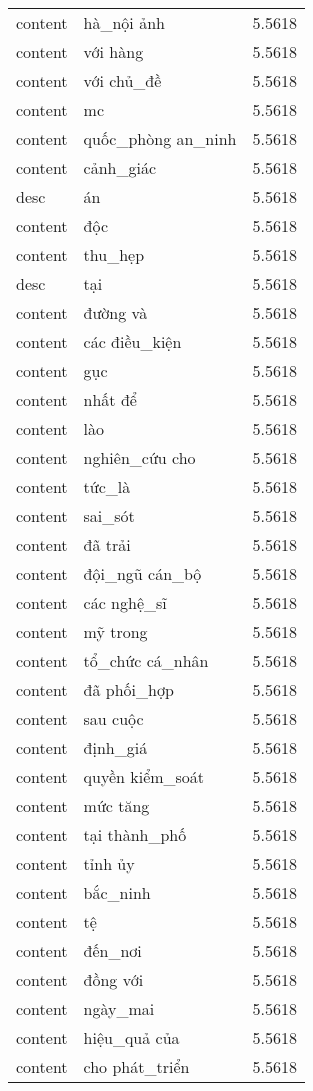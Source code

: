 \documentclass{article}
\begin{document}
\begin{tabular}{lll}
content & hà\_nội ảnh & 5.5618\\
content & với hàng & 5.5618\\
content & với chủ\_đề & 5.5618\\
content & mc & 5.5618\\
content & quốc\_phòng an\_ninh & 5.5618\\
content & cảnh\_giác & 5.5618\\
desc & án & 5.5618\\
content & độc & 5.5618\\
content & thu\_hẹp & 5.5618\\
desc & tại & 5.5618\\
content & đường và & 5.5618\\
content & các điều\_kiện & 5.5618\\
content & gục & 5.5618\\
content & nhất để & 5.5618\\
content & lào & 5.5618\\
content & nghiên\_cứu cho & 5.5618\\
content & tức\_là & 5.5618\\
content & sai\_sót & 5.5618\\
content & đã trải & 5.5618\\
content & đội\_ngũ cán\_bộ & 5.5618\\
content & các nghệ\_sĩ & 5.5618\\
content & mỹ trong & 5.5618\\
content & tổ\_chức cá\_nhân & 5.5618\\
content & đã phối\_hợp & 5.5618\\
content & sau cuộc & 5.5618\\
content & định\_giá & 5.5618\\
content & quyền kiểm\_soát & 5.5618\\
content & mức tăng & 5.5618\\
content & tại thành\_phố & 5.5618\\
content & tỉnh ủy & 5.5618\\
content & bắc\_ninh & 5.5618\\
content & tệ & 5.5618\\
content & đến\_nơi & 5.5618\\
content & đồng với & 5.5618\\
content & ngày\_mai & 5.5618\\
content & hiệu\_quả của & 5.5618\\
content & cho phát\_triển & 5.5618\\

\end{tabular}
\end{document}
